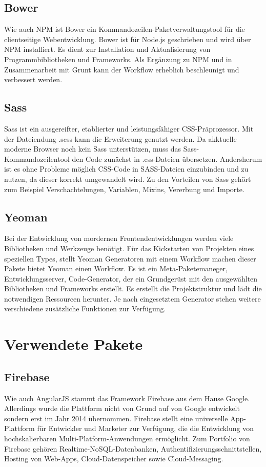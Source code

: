 \subsection{Bower}
Wie auch NPM ist Bower ein Kommandozeilen-Paketverwaltungstool für die clientseitige Webentwicklung. Bower ist für Node.js geschrieben und wird über NPM installiert.
Es dient zur Installation und Aktualisierung von Programmbibliotheken und Frameworks. Als Ergänzung zu NPM und in Zusammenarbeit mit Grunt kann der Workflow erheblich beschleunigt und verbessert werden.

\subsection{Sass}
Sass ist ein ausgereifter, etablierter und leistungsfähiger CSS-Präprozessor.
Mit der Dateiendung .scss kann die Erweiterung genutzt werden. Da akktuelle moderne Browser noch kein Sass unterstützen, muss das Sass-Kommandozeilentool den Code zunächst in .css-Dateien übersetzen.
Andersherum ist es ohne Probleme möglich CSS-Code in SASS-Dateien einzubinden und zu nutzen, da dieser korrekt umgewandelt wird. Zu den Vorteilen von Sass gehört zum Beispiel
Verschachtelungen, Variablen, Mixins, Vererbung und Importe.

\subsection{Yeoman}
Bei der Entwicklung von mordernen Frontendentwicklungen werden viele Bibliotheken und Werkzeuge benötigt.
Für das Kickstarten von Projekten eines speziellen Types, stellt Yeoman Generatoren mit einem Workflow  machen dieser Pakete bietet Yeoman einen Workflow. Es ist ein Meta-Paketemaneger, Entwicklungsserver, Code-Generator, der ein Grundgerüst mit den ausgewählten Bibliotheken und Frameworks erstellt. Es erstellt die Projektstruktur und lädt die notwendigen Ressourcen herunter. Je nach eingesetztem Generator stehen weitere verschiedene zusätzliche Funktionen zur Verfügung.

\section{Verwendete Pakete}
\subsection{Firebase}
Wie auch AngularJS stammt das Framework Firebase aus dem Hause Google. Allerdings wurde die Plattform nicht von Grund auf von Google entwickelt sondern erst im Jahr 2014 übernommen.
Firebase stellt eine universelle App-Plattform für Entwickler und Marketer zur Verfügung, die die Entwicklung von hochskalierbaren Multi-Platform-Anwendungen ermöglicht.
Zum Portfolio von Firebase gehören Realtime-NoSQL-Datenbanken, Authentifizierungsschnittstellen, Hosting von Web-Apps, Cloud-Datenspeicher sowie Cloud-Messaging.

